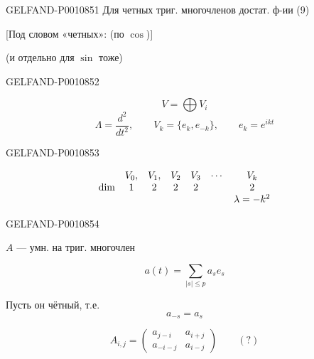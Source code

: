 \begin{GelfandAdjacentEvidence}{GELFAND-P001085}{1}
Для четных триг. многочленов достат. ф-ии (9)

[Под словом «четных»: (по $\cos$)]

(и отдельно для $\sin$ тоже)
\end{GelfandAdjacentEvidence}
\begin{GelfandAdjacentEvidence}{GELFAND-P001085}{2}


\[
V=\bigoplus V_i
\]
\begin{equation*}
\Lambda=\frac{d^2}{dt^2},\qquad
V_k=\{e_k,e_{-k}\},\qquad e_k=e^{ikt}
\tag{13}
\end{equation*}
\end{GelfandAdjacentEvidence}
\begin{GelfandAdjacentEvidence}{GELFAND-P001085}{3}


\[
\begin{array}{c c c c c c c}
 & V_0, & V_1, & V_2 & V_3 & \cdots & V_k\\
\dim & 1 & 2 & 2 & 2 & & 2\\
 & & & & & & \lambda=-k^2
\end{array}
\]
\end{GelfandAdjacentEvidence}
\begin{GelfandAdjacentEvidence}{GELFAND-P001085}{4}


$A$ — умн. на триг. многочлен

\begin{equation*}
a(t)=\sum_{\lvert s\rvert\le p}a_se_s
\tag{14}
\end{equation*}

Пусть он чётный, т.е.
\begin{equation*}
a_{-s}=a_s
\tag{15}
\end{equation*}

\begin{equation*}
A_{i,j}=
\begin{pmatrix}
a_{j-i} & a_{i+j}\\
a_{-i-j} & a_{i-j}
\end{pmatrix}
\qquad (?)
\tag{16}
\end{equation*}
\end{GelfandAdjacentEvidence}

